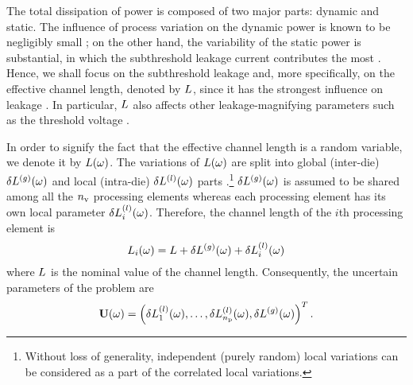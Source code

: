 The total dissipation of power is composed of two major parts: dynamic and static.
The influence of process variation on the dynamic power is known to be negligibly small \cite{srivastava2010, juan2011, juan2012}; on the other hand, the variability of the static power is substantial, in which the subthreshold leakage current contributes the most \cite{juan2011, juan2012}.
Hence, we shall focus on the subthreshold leakage and, more specifically, on the effective channel length, denoted by $L$, since it has the strongest influence on leakage \cite{chandrakasan2001}.
In particular, $L$ also affects other leakage-magnifying parameters such as the threshold voltage \cite{juan2011}.

In order to signify the fact that the effective channel length is a random variable, we denote it by $L(\omega)$.
The variations of $L(\omega)$ are split into global (inter-die) ${\delta L^{(g)}}(\omega)$ and local (intra-die) $\delta L^{(l)}(\omega)$ parts \cite{chandra2010, shen2009}.\footnote{Without loss of generality, independent (purely random) local variations can be considered as a part of the correlated local variations.}
${\delta L^{(g)}}(\omega)$ is assumed to be shared among all the ${n_\text{v}}$ processing elements whereas each processing element has its own local parameter $\delta L^{(l)}_i(\omega)$.
Therefore, the channel length of the $i$th processing element is
\begin{equation} \elabel{leakage-partition}
  \Leff_i(\o) = \nLeff + \gLeff(\o) + \lLeff_i(\o)
\end{equation}
where $L$ is the nominal value of the channel length. Consequently, the uncertain parameters of the problem are
\begin{equation} \elabel{uncertain-parameters}
  \vU(\o) = \vec{\lLeff_1(\o), \dotsc, \lLeff_\nprocs(\o), \gLeff(\o) }.
\end{equation}

